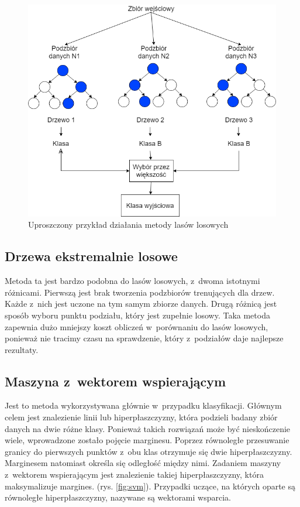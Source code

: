 \begin{figure}
	\centering
	\includegraphics[width=0.7\linewidth]{images/random_forest.png}
	\caption{Uproszczony przykład działania metody lasów losowych}
	\label{fig:random_forest}
\end{figure}

\subsection{Drzewa ekstremalnie losowe} 
Metoda ta jest bardzo podobna do lasów losowych, z~dwoma istotnymi różnicami. Pierwszą jest brak tworzenia podzbiorów trenujących dla drzew. Każde z~nich jest uczone na tym samym zbiorze danych. Drugą różnicą jest sposób wyboru punktu podziału, który jest zupełnie losowy. Taka metoda zapewnia dużo mniejszy koszt obliczeń w~porównaniu do lasów losowych, ponieważ nie tracimy czasu na sprawdzenie, który z~podziałów daje najlepsze rezultaty.

\subsection{Maszyna z~wektorem wspierającym} 
Jest to metoda wykorzystywana głównie w~przypadku klasyfikacji. Głównym celem jest znalezienie linii lub hiperpłaszczyzny, która podzieli badany zbiór danych na dwie różne klasy. Ponieważ takich rozwiązań może być nieskończenie wiele, wprowadzone zostało pojęcie marginesu. Poprzez równoległe przesuwanie granicy do pierwszych punktów z~obu klas otrzymuje się dwie hiperpłaszczyzny. Marginesem natomiast określa się odległość między nimi. Zadaniem maszyny z~wektorem wspierającym jest znalezienie takiej hiperpłaszczyzny, która maksymalizuje margines. (rys. \ref{fig:svm}). Przypadki uczące, na których oparte są równoległe hiperpłaszczyzny, nazywane są wektorami wsparcia.

